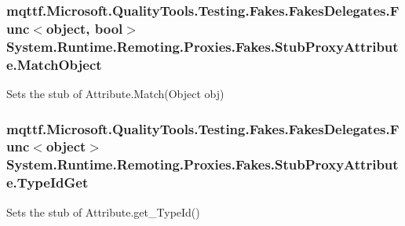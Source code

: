 \hypertarget{class_system_1_1_runtime_1_1_remoting_1_1_proxies_1_1_fakes_1_1_stub_proxy_attribute_a21c3da4e451e1b962c8e7b198a7772bb}{
\subsubsection[{Match\-Object}]{\setlength{\rightskip}{0pt plus 5cm}mqttf.\-Microsoft.\-Quality\-Tools.\-Testing.\-Fakes.\-Fakes\-Delegates.\-Func$<$object, bool$>$ System.\-Runtime.\-Remoting.\-Proxies.\-Fakes.\-Stub\-Proxy\-Attribute.\-Match\-Object}}\label{class_system_1_1_runtime_1_1_remoting_1_1_proxies_1_1_fakes_1_1_stub_proxy_attribute_a21c3da4e451e1b962c8e7b198a7772bb}


Sets the stub of Attribute.\-Match(\-Object obj)

\hypertarget{class_system_1_1_runtime_1_1_remoting_1_1_proxies_1_1_fakes_1_1_stub_proxy_attribute_a463844c02686a34fa31032140cdaea45}{
\subsubsection[{Type\-Id\-Get}]{\setlength{\rightskip}{0pt plus 5cm}mqttf.\-Microsoft.\-Quality\-Tools.\-Testing.\-Fakes.\-Fakes\-Delegates.\-Func$<$object$>$ System.\-Runtime.\-Remoting.\-Proxies.\-Fakes.\-Stub\-Proxy\-Attribute.\-Type\-Id\-Get}}\label{class_system_1_1_runtime_1_1_remoting_1_1_proxies_1_1_fakes_1_1_stub_proxy_attribute_a463844c02686a34fa31032140cdaea45}


Sets the stub of Attribute.\-get\-\_\-\-Type\-Id()



